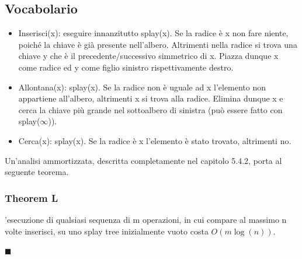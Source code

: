\documentclass[a4paper]{book}
\newenvironment{mytheorem}[1]{\subsubsection*{Theorem #1}}{\begin{flushright}$\blacksquare$\end{flushright}}
\begin{document}
\subsection*{Vocabolario}
\begin{itemize}
\item Inserisci(x): eseguire innanzitutto splay(x). Se la radice è x non fare niente, poiché la chiave è già presente nell'albero. Altrimenti nella radice si trova una chiave y che è il precedente/successivo simmetrico di x. Piazza dunque x come radice ed y come figlio sinistro rispettivamente destro.
\item Allontana(x): splay(x). Se la radice non è uguale ad x l'elemento non appartiene all'albero, altrimenti x si trova alla radice. Elimina dunque x e cerca la chiave più grande nel sottoalbero di sinistra (può essere fatto con splay($\infty$)). 
\item Cerca(x): splay(x). Se la radice è x l'elemento è stato trovato, altrimenti no.
\end{itemize}
Un'analisi ammortizzata, descritta completamente nel capitolo 5.4.2, porta al seguente teorema.
\begin{mytheorem}{5.1}
L'esecuzione di qualsiasi sequenza di m operazioni, in cui compare al massimo n volte inserisci, su uno splay tree inizialmente vuoto costa $O(m\log (n))$. 
\end{mytheorem}
\end{document}
